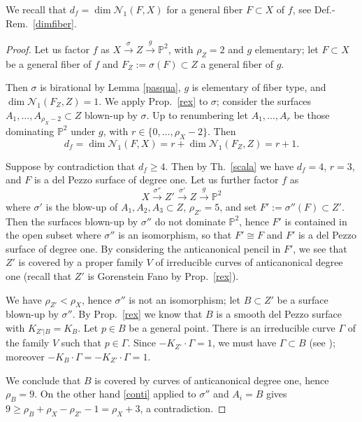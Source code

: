 \documentclass[a4paper,12pt]{amsart}
\theoremstyle{definition}
\numberwithin{figure}{section}
\numberwithin{table}{section}
\newcommand{\la}{\longrightarrow}
\newcommand{\pr}{\mathbb{P}}
\newcommand{\N}{\mathcal{N}_1}
\begin{document}
\noindent We recall that $d_f=\dim\N(F,X)$ for a general fiber $F\subset X$ of $f$, see Def.-Rem.~\ref{dimfiber}.
             \begin{proof}
               Let us  factor $f$ as $X\stackrel{\sigma}{\to} Z \stackrel{g}{\to}\pr^2$, with $\rho_Z=2$ and $g$ elementary; let $F\subset X$ be a general fiber of $f$ and $F_Z:=\sigma(F)\subset Z$ a general fiber of $g$.
               
               Then $\sigma$ is birational by Lemma \ref{pasqua},
$g$ is elementary of fiber type, and $\dim\N(F_Z,Z)=1$. 
               We apply Prop.~\ref{rex} to $\sigma$;
consider the surfaces $A_1,\dotsc,A_{\rho_X-2}\subset Z$ blown-up by $\sigma$.
Up to renumbering
               let $A_1,\dotsc,A_r$ be those dominating $\pr^2$ under $g$, with $r\in\{0,\dotsc,\rho_X-2\}$.
               Then
               $$d_f=\dim\N(F,X)=r+\dim\N(F_Z,Z)=r+1.$$ 
               
  Suppose by contradiction that $d_f\geq 4$. Then by Th.~\ref{scala} we have $d_f=4$, $r=3$, and  $F$  is a del Pezzo surface of degree one.
               Let us further factor $f$ as
               $$X\stackrel{\sigma''}{\la}Z'\stackrel{\sigma'}{\la} Z\stackrel{g}{\la}\pr^2$$
               where $\sigma'$ is the blow-up of  $A_1,A_2,A_3\subset Z$, $\rho_{Z'}=5$,  and set $F':=\sigma''(F)\subset Z'$. Then the surfaces blown-up by $\sigma''$ do not dominate $\pr^2$, hence $F'$ is contained in the open subset where $\sigma''$ is an isomorphism, so that $F'\cong F$ and $F'$ is a del Pezzo surface of degree one. 
               By considering the anticanonical pencil in $F'$, we see that $Z'$ is covered by a proper family $V$ of irreducible curves of anticanonical degree one (recall that $Z'$ is Gorenstein Fano by Prop.~\ref{rex}).
             
           We have    $\rho_{Z'}<\rho_X$, hence $\sigma''$ is not an isomorphism;  
               let $B\subset Z'$ be a surface blown-up by $\sigma''$. By
      Prop.~\ref{rex}      we know that  $B$ is a smooth del Pezzo surface with $K_{Z'|B}=K_{B}$.  
               Let $p\in B$ be a general point. There is an irreducible curve $\Gamma$ of the family $V$ such that $p\in\Gamma$. Since $-K_{Z'}\cdot\Gamma=1$, we must have $\Gamma\subset B$  (see \cite[Prop.~2.10]{3folds}); moreover
     $-K_{B}\cdot\Gamma=-K_{Z'}\cdot\Gamma=1$.

               We conclude that $B$ is covered by curves of anticanonical degree one, hence $\rho_{B}=9$. On the other hand  \eqref{conti} applied to $\sigma''$  and $A_i=B$ gives
               $9\geq\rho_{B}+\rho_X-\rho_{Z'}-1=\rho_X+3$,  a contradiction.
             \end{proof}
\end{document}
